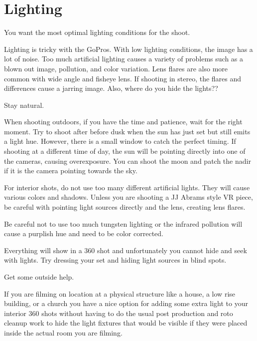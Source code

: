 \chapter{Lighting}
\pagecolor{white}
\label{chap:25}
\begin{fullwidth}


\problem

{\large You want the most optimal lighting conditions for the shoot. \par}

Lighting is tricky with the GoPros. With low lighting conditions, the image has a lot of noise. Too much artificial lighting causes a variety of problems such as a blown out image, pollution, and color variation. Lens flares are also more common with wide angle and fisheye lens. If shooting in stereo, the flares and differences cause a jarring image. Also, where do you hide the lights??

\solution

{\large Stay natural. \par}

When shooting outdoors, if you have the time and patience, wait for the right moment. Try to shoot after before dusk when the sun has just set but still emits a light hue. However, there is a small window to catch the perfect timing. If shooting at a different time of day, the sun will be pointing directly into one of the cameras, causing overexposure. You can shoot the moon and patch the nadir if it is the camera pointing towards the sky. 

For interior shots, do not use too many different artificial lights. They will cause various colors and shadows. Unless you are shooting a JJ Abrams style VR piece, be careful with pointing light sources directly and the lens, creating lens flares.

Be careful not to use too much tungsten lighting or the infrared pollution will cause a purplish hue and need to be color corrected. 

Everything will show in a 360 shot and unfortunately you cannot hide and seek with lights. Try dressing your set and hiding light sources in blind spots. 

{\large Get some outside help. \par}

If you are filming on location at a physical structure like a house, a low rise building, or a church you have a nice option for adding some extra light to your interior 360 shots without having to do the usual post production and roto cleanup work to hide the light fixtures that would be visible if they were placed inside the actual room you are filming. 


\end{fullwidth}
